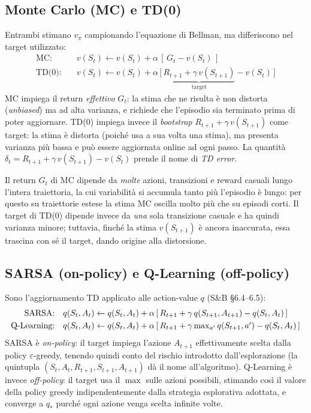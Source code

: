 \subsection{Monte Carlo (MC) e TD(0)}
Entrambi stimano $v_\pi$ campionando l'equazione di Bellman, ma differiscono nel
target utilizzato:
\begin{align}
  \text{MC:}\quad   & v(S_t) \leftarrow v(S_t) + \alpha\,[\,G_t - v(S_t)\,] \\
  \text{TD(0):}\quad& v(S_t) \leftarrow v(S_t) + \alpha\,\big[\,\underbrace{R_{t+1} + \gamma\, v(S_{t+1})}_{\text{target}} - v(S_t)\,\big]
\end{align}
MC impiega il return \emph{effettivo} $G_t$: la stima che ne risulta \`e non distorta
(\emph{unbiased}) ma ad alta varianza, e richiede che l'episodio sia terminato prima di
poter aggiornare. TD(0) impiega invece il \emph{bootstrap}
$R_{t+1}+\gamma\, v(S_{t+1})$ come target: la stima \`e distorta (poich\'e usa a sua
volta una stima), ma presenta varianza pi\`u bassa e pu\`o essere aggiornata online ad
ogni passo. La quantit\`a $\delta_t = R_{t+1}+\gamma\, v(S_{t+1})-v(S_t)$ prende il
nome di \emph{TD error}.

Il return $G_t$ di MC dipende da \emph{molte}
azioni, transizioni e reward casuali lungo l'intera traiettoria, la cui variabilit\`a si
accumula tanto pi\`u l'episodio \`e lungo: per questo su traiettorie estese la stima MC
oscilla molto pi\`u che su episodi corti. Il target di TD(0) dipende invece da
\emph{una} sola transizione casuale e ha quindi varianza minore; tuttavia, finch\'e la
stima $v(S_{t+1})$ \`e ancora inaccurata, essa trascina con s\'e il target, dando origine
alla distorsione. 

\subsection{SARSA (on-policy) e Q-Learning (off-policy)}
Sono l'aggiornamento TD applicato alle action-value $q$ (S\&B \S6.4--6.5):
\begin{align}
  \text{SARSA:}\quad & q(S_t,A_t) \leftarrow q(S_t,A_t) + \alpha\,[\,R_{t+1} + \gamma\, q(S_{t+1},A_{t+1}) - q(S_t,A_t)\,] \\
  \text{Q\hbox{-}Learning:}\quad & q(S_t,A_t) \leftarrow q(S_t,A_t) + \alpha\,[\,R_{t+1} + \gamma \textstyle\max_{a'} q(S_{t+1},a') - q(S_t,A_t)\,]
\end{align}
SARSA \`e \emph{on-policy}: il target impiega l'azione $A_{t+1}$ effettivamente scelta
dalla policy $\varepsilon$-greedy, tenendo quindi conto del rischio introdotto
dall'esplorazione (la quintupla $(S_t,A_t,R_{t+1},S_{t+1},A_{t+1})$ d\`a il nome
all'algoritmo). Q\hbox{-}Learning \`e invece \emph{off-policy}: il target usa il $\max$
sulle azioni possibili, stimando cos\`i il valore della policy greedy indipendentemente
dalla strategia esplorativa adottata, e converge a $q_*$ purch\'e ogni azione venga
scelta infinite volte.

